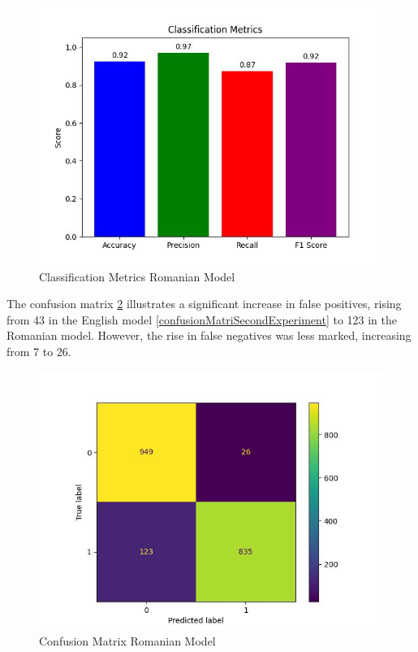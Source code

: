\begin{figure}[htbp]
	\centering
		\includegraphics[scale=0.8]{LaTeX Bachelor Thesis Depression Signs Detection/figures/metrics/experimentRomanian/classificationMetrics.jpg}
	\caption{Classification Metrics Romanian Model}
	\label{classificationMetricsRomanianExperiment}
\end{figure}

The confusion matrix \ref{confusionMatrixRomanianExperiment} illustrates a significant increase in false positives, rising from 43 in the English model \ref{confusionMatriSecondExperiment} to 123 in the Romanian model. However, the rise in false negatives was less marked, increasing from 7 to 26.

\begin{figure}[htbp]
	\centering
		\includegraphics[scale=0.8]{LaTeX Bachelor Thesis Depression Signs Detection/figures/metrics/experimentRomanian/confusionMatrix.jpg}
	\caption{Confusion Matrix Romanian Model}
	\label{confusionMatrixRomanianExperiment}
\end{figure}

